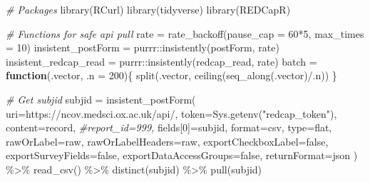 \documentclass[
]{book}
\newenvironment{Shaded}{\begin{snugshade}}{\end{snugshade}}
\newcommand{\AttributeTok}[1]{\textcolor[rgb]{0.77,0.63,0.00}{#1}}
\newcommand{\CommentTok}[1]{\textcolor[rgb]{0.56,0.35,0.01}{\textit{#1}}}
\newcommand{\ControlFlowTok}[1]{\textcolor[rgb]{0.13,0.29,0.53}{\textbf{#1}}}
\newcommand{\DecValTok}[1]{\textcolor[rgb]{0.00,0.00,0.81}{#1}}
\newcommand{\FunctionTok}[1]{\textcolor[rgb]{0.00,0.00,0.00}{#1}}
\newcommand{\NormalTok}[1]{#1}
\newcommand{\OtherTok}[1]{\textcolor[rgb]{0.56,0.35,0.01}{#1}}
\newcommand{\SpecialCharTok}[1]{\textcolor[rgb]{0.00,0.00,0.00}{#1}}
\newcommand{\StringTok}[1]{\textcolor[rgb]{0.31,0.60,0.02}{#1}}
\begin{document}
\begin{Shaded}
\begin{Highlighting}[]
\CommentTok{\# Packages}
\FunctionTok{library}\NormalTok{(RCurl)}
\FunctionTok{library}\NormalTok{(tidyverse)}
\FunctionTok{library}\NormalTok{(REDCapR)}

\CommentTok{\# Functions for safe api pull}
\NormalTok{rate }\OtherTok{=} \FunctionTok{rate\_backoff}\NormalTok{(}\AttributeTok{pause\_cap =} \DecValTok{60}\SpecialCharTok{*}\DecValTok{5}\NormalTok{, }\AttributeTok{max\_times =} \DecValTok{10}\NormalTok{)}
\NormalTok{insistent\_postForm }\OtherTok{=}\NormalTok{ purrr}\SpecialCharTok{::}\FunctionTok{insistently}\NormalTok{(postForm, rate)}
\NormalTok{insistent\_redcap\_read }\OtherTok{=}\NormalTok{ purrr}\SpecialCharTok{::}\FunctionTok{insistently}\NormalTok{(redcap\_read, rate)}
\NormalTok{batch }\OtherTok{=} \ControlFlowTok{function}\NormalTok{(.vector, }\AttributeTok{.n =} \DecValTok{200}\NormalTok{)\{}
  \FunctionTok{split}\NormalTok{(.vector, }\FunctionTok{ceiling}\NormalTok{(}\FunctionTok{seq\_along}\NormalTok{(.vector)}\SpecialCharTok{/}\NormalTok{.n))}
\NormalTok{\}}

\CommentTok{\# Get subjid}
\NormalTok{subjid }\OtherTok{=} \FunctionTok{insistent\_postForm}\NormalTok{(}
  \AttributeTok{uri=}\StringTok{\textquotesingle{}https://ncov.medsci.ox.ac.uk/api/\textquotesingle{}}\NormalTok{,}
  \AttributeTok{token=}\FunctionTok{Sys.getenv}\NormalTok{(}\StringTok{"redcap\_token"}\NormalTok{),}
  \AttributeTok{content=}\StringTok{\textquotesingle{}record\textquotesingle{}}\NormalTok{,}
  \CommentTok{\#report\_id=\textquotesingle{}999\textquotesingle{},}
  \StringTok{\textquotesingle{}fields[0]\textquotesingle{}}\OtherTok{=}\StringTok{\textquotesingle{}subjid\textquotesingle{}}\NormalTok{,}
  \AttributeTok{format=}\StringTok{\textquotesingle{}csv\textquotesingle{}}\NormalTok{,}
  \AttributeTok{type=}\StringTok{\textquotesingle{}flat\textquotesingle{}}\NormalTok{,}
  \AttributeTok{rawOrLabel=}\StringTok{\textquotesingle{}raw\textquotesingle{}}\NormalTok{,}
  \AttributeTok{rawOrLabelHeaders=}\StringTok{\textquotesingle{}raw\textquotesingle{}}\NormalTok{,}
  \AttributeTok{exportCheckboxLabel=}\StringTok{\textquotesingle{}false\textquotesingle{}}\NormalTok{,}
  \AttributeTok{exportSurveyFields=}\StringTok{\textquotesingle{}false\textquotesingle{}}\NormalTok{,}
  \AttributeTok{exportDataAccessGroups=}\StringTok{\textquotesingle{}false\textquotesingle{}}\NormalTok{,}
  \AttributeTok{returnFormat=}\StringTok{\textquotesingle{}json\textquotesingle{}}
\NormalTok{  ) }\SpecialCharTok{\%\textgreater{}\%} 
  \FunctionTok{read\_csv}\NormalTok{() }\SpecialCharTok{\%\textgreater{}\%} 
  \FunctionTok{distinct}\NormalTok{(subjid) }\SpecialCharTok{\%\textgreater{}\%} 
  \FunctionTok{pull}\NormalTok{(subjid)}


\end{Highlighting}
\end{Shaded}
\end{document}
